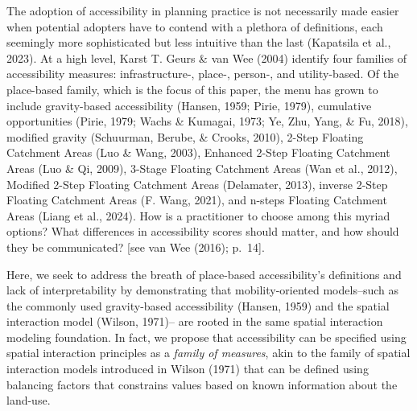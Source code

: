 \documentclass[
11pt, %
oneside, %
english, %
singlespacing, %
]{macthesis} %
\begin{document}
The adoption of accessibility in planning practice is not necessarily made easier when potential adopters have to contend with a plethora of definitions, each seemingly more sophisticated but less intuitive than the last (Kapatsila et al., 2023). At a high level, Karst T. Geurs \& van Wee (2004) identify four families of accessibility measures: infrastructure-, place-, person-, and utility-based. Of the place-based family, which is the focus of this paper, the menu has grown to include gravity-based accessibility (Hansen, 1959; Pirie, 1979), cumulative opportunities (Pirie, 1979; Wachs \& Kumagai, 1973; Ye, Zhu, Yang, \& Fu, 2018), modified gravity (Schuurman, Berube, \& Crooks, 2010), 2-Step Floating Catchment Areas (Luo \& Wang, 2003), Enhanced 2-Step Floating Catchment Areas (Luo \& Qi, 2009), 3-Stage Floating Catchment Areas (Wan et al., 2012), Modified 2-Step Floating Catchment Areas (Delamater, 2013), inverse 2-Step Floating Catchment Areas (F. Wang, 2021), and n-steps Floating Catchment Areas (Liang et al., 2024). How is a practitioner to choose among this myriad options? What differences in accessibility scores should matter, and how should they be communicated? {[}see van Wee (2016); p.~14{]}.

Here, we seek to address the breath of place-based accessibility's definitions and lack of interpretability by demonstrating that mobility-oriented models--such as the commonly used gravity-based accessibility (Hansen, 1959) and the spatial interaction model (Wilson, 1971)-- are rooted in the same spatial interaction modeling foundation. In fact, we propose that accessibility can be specified using spatial interaction principles as a \emph{family of measures}, akin to the family of spatial interaction models introduced in Wilson (1971) that can be defined using balancing factors that constrains values based on known information about the land-use.
\end{document}
